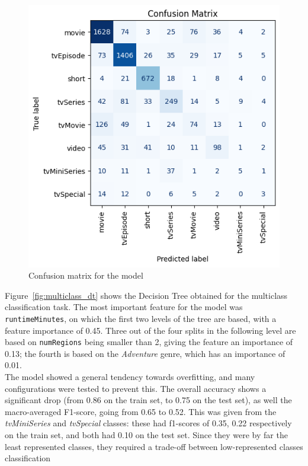 \begin{figure}
    \centering
    \captionsetup{justification=raggedleft, width=1\linewidth}
    \caption{Confusion matrix for the model}
    \label{fig:multiclass_dt_conf_matrix}
    \includegraphics[width=0.9\linewidth]{plots/multiclass_dt_conf_matrix.png}
\end{figure}
Figure~\ref{fig:multiclass_dt} shows the Decision Tree obtained for the multiclass classification task.
The most important feature for the model was \texttt{runtimeMinutes}, on which the first two levels
of the tree are based, with a feature importance of 0.45.
Three out of the four splits in the following level are based on \texttt{numRegions} being smaller than
2, giving the feature an importance of 0.13; the fourth is based on the \textit{Adventure} genre,
which has an importance of 0.01.\\
The model showed a general tendency towards overfitting, and many configurations were tested to prevent
this.
The overall accuracy shows a significant drop (from 0.86 on the train set, to 0.75 on the test set),
as well the macro-averaged F1-score, going from 0.65 to 0.52.
This was given from the \textit{tvMiniSeries} and \textit{tvSpecial} classes: these had f1-scores of
0.35, 0.22 respectively on the train set, and both had 0.10 on the test set. Since they were by far
the least represented classes, they required a trade-off between low-represented classes classification
